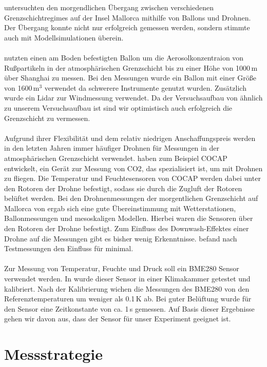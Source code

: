 \documentclass[a4paper,11pt,DIV=calc,tablecaptionabove,headinclude,twoside]{article}
\begin{document}
\citet{jimenez2016morning} untersuchten den morgendlichen Übergang zwischen verschiedenen Grenzschichtregimes auf der Insel Mallorca mithilfe von Ballons und Drohnen. Der Übergang konnte nicht nur erfolgreich gemessen werden, sondern stimmte auch mit Modellsimulationen überein.\\\\ 
\citet{Li2015TetheredBB} nutzten einen am Boden befestigten Ballon um die Aerosolkonzentraion von Rußpartikeln in der atmosphärischen Grenzschicht bis zu einer Höhe von 1000\,m über Shanghai zu messen. Bei den Messungen wurde ein Ballon mit einer Größe von 1600\,m$^{3}$ verwendet da schwerere Instrumente genutzt wurden. Zusätzlich wurde ein Lidar zur Windmessung verwendet. Da der Versuchsaufbau von \citet{Li2015TetheredBB} ähnlich zu unserem Versuchsaufbau ist sind wir optimistisch auch erfolgreich die Grenzschicht zu vermessen.\\\\
Aufgrund ihrer Flexibilität und dem relativ niedrigen Anschaffungspreis werden
in den letzten Jahren immer häufiger Drohnen für Messungen in der atmosphärischen Grenzschicht verwendet. \citet{kunz2018cocap} haben zum Beispiel COCAP entwickelt, ein Gerät zur Messung von CO2, das spezialisiert ist, um mit Drohnen zu fliegen. Die Temperatur und Feuchtesensoren von COCAP werden dabei unter den Rotoren der Drohne befestigt, sodass sie durch die 
Zugluft der Rotoren belüftet werden. Bei den Drohnenmessungen  der morgentlichen Grenzschicht auf Mallorca von \citet{jimenez2016morning} ergab sich eine gute Übereinstimmung mit Wetterstationen, Ballonmessungen und mesoskaligen Modellen. Hierbei waren die Sensoren über den Rotoren
der Drohne befestigt. Zum Einfluss des Downwash-Effektes einer Drohne auf die Messungen gibt es bisher wenig Erkenntnisse. \citet{zhou2017small} befand nach Testmessungen den Einfluss für minimal.\\\\
Zur Messung von Temperatur, Feuchte und Druck soll ein BME280 Sensor verwendet werden. In \citet{otte2018cost} wurde dieser Sensor in einer Klimakammer getestet und kalibriert. Nach der Kalibrierung wichen die Messungen des BME280 von den Referenztemperaturen um weniger als 0.1\,K ab. Bei guter Belüftung wurde für den Sensor eine Zeitkonstante von ca. 1\,s gemessen. Auf Basis dieser Ergebnisse gehen wir davon aus, dass der Sensor für unser Experiment geeignet ist.  

\section{Messstrategie}
\end{document}
